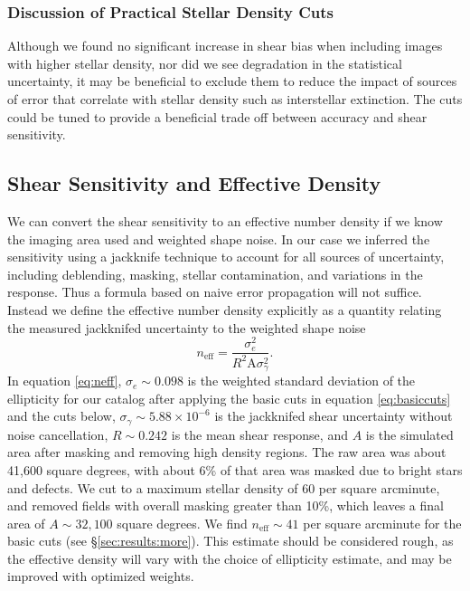 \documentclass[twocolumn,twocolappendix,astrosym]{openjournal}
\begin{document}
\subsubsection{Discussion of Practical Stellar Density Cuts}

Although we found no significant increase in shear bias when including images
with higher stellar density, nor did we see degradation in the statistical
uncertainty, it may be beneficial to exclude them to reduce the impact of
sources of error that correlate with stellar density such as interstellar
extinction.  The cuts could be tuned to provide a beneficial trade off
between accuracy and shear sensitivity.

\subsection{Shear Sensitivity and Effective Density} \label{sec:results:effdens}


We can convert the shear sensitivity to an effective number density if we know
the imaging area used and weighted shape noise.  In our case we inferred the
sensitivity using a jackknife technique to account for all sources of
uncertainty, including deblending, masking, stellar contamination, and
variations in the response.  Thus a formula based on naive error propagation
will not suffice.  Instead we define the effective number density explicitly as
a quantity relating the measured jackknifed uncertainty to the weighted shape
noise
\begin{equation} \label{eq:neff}
    n_{\mathrm{eff}} = \frac{\sigma^2_{e}}{R^2 \mathrm{A} \sigma^2_{\gamma}}.
\end{equation}
In equation \ref{eq:neff}, $\sigma_e \sim 0.098$ is the weighted standard
deviation of the ellipticity for our catalog after applying the basic cuts in
equation \ref{eq:basiccuts} and the cuts below, $\sigma_\gamma \sim 5.88 \times
10^{-6}$ is the jackknifed shear uncertainty without noise cancellation, $R
\sim 0.242$ is the mean shear response, and $A$ is the simulated area after
masking and removing high density regions.    The raw area was about 41,600
square degrees, with about 6\% of that area was masked due to bright stars and
defects.  We cut to a maximum stellar density of 60 per square arcminute, and
removed fields with overall masking greater than 10\%, which leaves a final
area of $A \sim 32,100$ square degrees.  We find $n_\mathrm{eff} \sim 41$ per
square arcminute for the basic cuts (see \S \ref{sec:results:more}).  This
estimate should be considered rough, as the effective density will vary with
the choice of ellipticity estimate, and may be improved with optimized weights.
\end{document}
